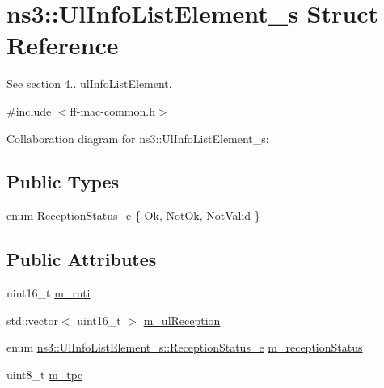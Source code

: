 \hypertarget{structns3_1_1UlInfoListElement__s}{}\section{ns3\+:\+:Ul\+Info\+List\+Element\+\_\+s Struct Reference}
\label{structns3_1_1UlInfoListElement__s}


See section 4.. ul\+Info\+List\+Element.  




{\ttfamily \#include $<$ff-\/mac-\/common.\+h$>$}



Collaboration diagram for ns3\+:\+:Ul\+Info\+List\+Element\+\_\+s\+:
\subsection*{Public Types}
\begin{DoxyCompactItemize}
\item 
enum \hyperlink{structns3_1_1UlInfoListElement__s_a2a4dff5145d25c81086660e991db6f61}{Reception\+Status\+\_\+e} \{ \hyperlink{structns3_1_1UlInfoListElement__s_a2a4dff5145d25c81086660e991db6f61a0a8fd1f9d7e6ac1517a35ec3be5b2b65}{Ok}, 
\hyperlink{structns3_1_1UlInfoListElement__s_a2a4dff5145d25c81086660e991db6f61a98aed738fd24811d3461668e394a53c8}{Not\+Ok}, 
\hyperlink{structns3_1_1UlInfoListElement__s_a2a4dff5145d25c81086660e991db6f61ad68e2111db9c2870c3953509c2812a51}{Not\+Valid}
 \}
\end{DoxyCompactItemize}
\subsection*{Public Attributes}
\begin{DoxyCompactItemize}
\item 
uint16\+\_\+t \hyperlink{structns3_1_1UlInfoListElement__s_ae723ffb561ca2d6b513ce25eedffaf2e}{m\+\_\+rnti}
\item 
std\+::vector$<$ uint16\+\_\+t $>$ \hyperlink{structns3_1_1UlInfoListElement__s_ab08157fa74477634814d352509a0bb4d}{m\+\_\+ul\+Reception}
\item 
enum \hyperlink{structns3_1_1UlInfoListElement__s_a2a4dff5145d25c81086660e991db6f61}{ns3\+::\+Ul\+Info\+List\+Element\+\_\+s\+::\+Reception\+Status\+\_\+e} \hyperlink{structns3_1_1UlInfoListElement__s_a09ce7d5c42bf8a6f241b6300e74eb815}{m\+\_\+reception\+Status}
\item 
uint8\+\_\+t \hyperlink{structns3_1_1UlInfoListElement__s_a2b029531a9d2bf62b15912f6056b4aab}{m\+\_\+tpc}
\end{DoxyCompactItemize}


